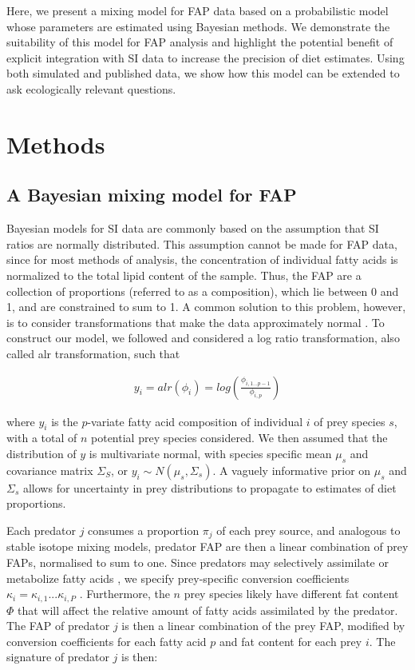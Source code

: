 \documentclass[12pt]{article}%
\begin{document}
\begin{spacing}{1.9}
\begin{flushleft}
Here, we present a mixing model for FAP data based on a probabilistic
model whose parameters are estimated using Bayesian methods. We
demonstrate the suitability of this model for FAP analysis and
highlight the potential benefit of explicit integration with SI data
to increase the precision of diet estimates. Using both simulated and
published data, we show how this model can be extended to ask
ecologically relevant questions.
 

\section{Methods}
\subsection{A Bayesian mixing model for FAP}

Bayesian models for SI data are commonly based on the assumption that
SI ratios are normally distributed. This assumption cannot be made for
FAP data, since for most methods of analysis, the concentration of
individual fatty acids is normalized to the total lipid content of the
sample. Thus, the FAP are a collection of proportions (referred to as
a composition), which lie between 0 and 1, and are constrained to sum
to 1. A common solution to this problem, however, is to consider
transformations that make the data approximately normal
\citep{budge_studying_2006}. To construct our model, we followed
\citet{aitchison_convex_1999} and considered a log ratio transformation,
also called alr transformation, such that

\begin{align}
y_i = alr(\phi_i) = log \left( \frac{\phi_{i,1...p-1}}{\phi_{i,p}} \right)
\end{align}

where $y_i$ is the $p$-variate fatty acid composition of individual
$i$ of prey species $s$, with a total of $n$ potential prey species considered. We then assumed that the distribution of $y$ is
multivariate normal, with species specific mean $\mu_s$ and covariance matrix $\Sigma_S$,
or $y_i \sim N(\mu_s,\Sigma_s)$. A vaguely informative prior on
$\mu_s$ and $\Sigma_s$ allows for uncertainty in prey distributions
\citep{ward_including_2010} to propagate to estimates of diet proportions.

Each predator $j$ consumes a proportion $\pi_j$ of each prey source, and
analogous to stable isotope mixing models, predator FAP are then a
linear combination of prey FAPs, normalised to sum to one. Since predators may selectively assimilate or metabolize fatty acids
\citep{iverson_quantitative_2004,budge_studying_2006,rosen_effects_2012},
we specify prey-specific conversion coefficients $\kappa_i
=\kappa_{i,1}...\kappa_{i,P}$ \citep{rosen_effects_2012}. Furthermore,
the $n$ prey species likely have different fat content $\Phi$
that will affect the relative amount of fatty acids assimilated by the
predator. The FAP of predator $j$ is then a linear combination of the prey
FAP, modified by conversion coefficients for each fatty acid $p$ and fat
content for each prey $i$. The signature of predator $j$ is then:


\end{flushleft}
\end{spacing}
\end{document}
